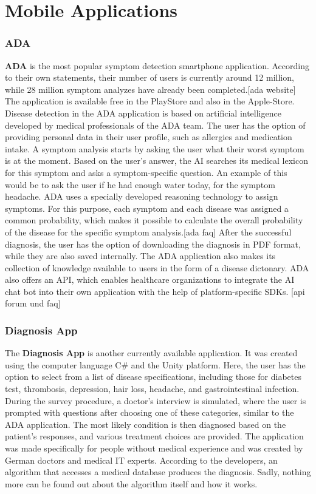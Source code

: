 \section{Mobile Applications}
\subsubsection{ADA} 
\textbf{ADA} is the most popular symptom detection smartphone application. According to their own statements, their number of users is currently around 12 million, while 28 million symptom analyzes have already been completed.[ada website] The application is available free in the PlayStore and also in the Apple-Store. Disease detection in the ADA application is based on artificial intelligence developed by medical professionals of the ADA team. The user has the option of providing personal data in their user profile, such as allergies and medication intake. A symptom analysis starts by asking the user what their worst symptom is at the moment. Based on the user's answer, the AI searches its medical lexicon for this symptom and asks a symptom-specific question. An example of this would be to ask the user if he had enough water today, for the symptom headache. ADA uses a specially developed reasoning technology to assign symptoms. For this purpose, each symptom and each disease was assigned a common probability, which makes it possible to calculate the overall probability of the disease for the specific symptom analysis.[ada faq] After the successful diagnosis, the user has the option of downloading the diagnosis in PDF format, while they are also saved internally. The ADA application also makes its collection of knowledge available to users in the form of a disease dictonary. ADA also offers an API, which enables healthcare organizations to integrate the AI chat bot into their own application with the help of platform-specific SDKs. [api forum und faq]

\subsubsection{Diagnosis App} 
The \textbf{Diagnosis App} is another currently available application. It was created using the computer language C\# and the Unity platform. Here, the user has the option to select from a list of disease specifications, including those for diabetes test, thrombosis, depression, hair loss, headache, and gastrointestinal infection. During the survey procedure, a doctor's interview is simulated, where the user is prompted with questions after choosing one of these categories, similar to the ADA application. The most likely condition is then diagnosed based on the patient's responses, and various treatment choices are provided. The application was made specifically for people without medical experience and was created by German doctors and medical IT experts. According to the developers, an algorithm that accesses a medical database produces the diagnosis. Sadly, nothing more can be found out about the algorithm itself and how it works. 

